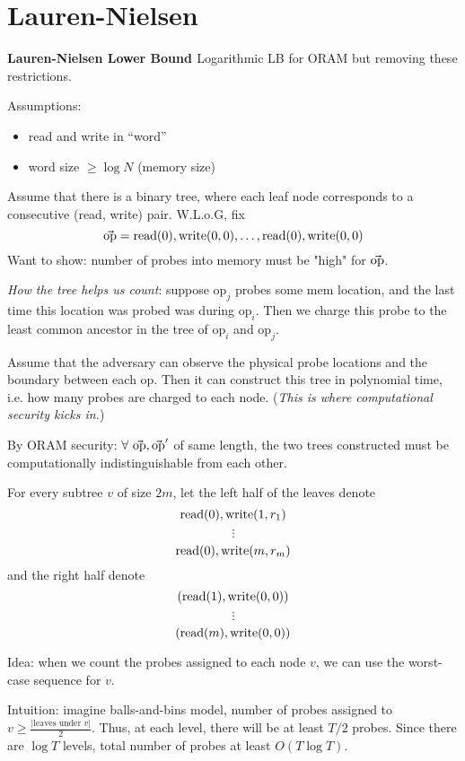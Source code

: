 \section{Lauren-Nielsen}

\textbf{Lauren-Nielsen Lower Bound \cite{larsen18lowerbound}} Logarithmic LB for ORAM but removing these restrictions.

\noindent Assumptions:
\begin{itemize}
  \item read and write in ``word''
  \item word size $\geq \log N$ (memory size)
\end{itemize}

Assume that there is a binary tree, where each leaf node corresponds to a consecutive (read, write) pair. W.L.o.G, fix 
$$\vec{\mbox{op}} = \mbox{read}(0), \mbox{write}(0, 0), \dots, \mbox{read}(0), \mbox{write}(0, 0)$$
Want to show: number of probes into memory must be "high" for $\vec{\mbox{op}}$.

\noindent \emph{How the tree helps us count}: suppose $\mbox{op}_j$ probes some mem location, and the last time this location was probed was during $\mbox{op}_i$. Then we charge this probe to the least common ancestor in the tree of $\mbox{op}_i$ and $\mbox{op}_j$.


Assume that the adversary can observe the physical probe locations and the boundary between each $\mbox{op}$. Then it can construct this tree in polynomial time, i.e. how many probes are charged to each node. (\emph{This is where computational security kicks in.})

By ORAM security: $\forall\ \vec{\mbox{op}}, \vec{\mbox{op}}'$ of same length, the two trees constructed must be computationally indistinguishable from each other.

For every subtree $v$ of size $2m$, let the left half of the leaves denote
$$\mbox{read}(0), \mbox{write}(1, r_1)$$
$$\vdots$$
$$\mbox{read}(0), \mbox{write}(m, r_m)$$
and the right half denote
$$(\mbox{read}(1), \mbox{write}(0, 0))$$
$$\vdots$$
$$(\mbox{read}(m), \mbox{write}(0, 0))$$

Idea: when we count the probes assigned to each node $v$, we can use the worst-case sequence for $v$.

Intuition: imagine balls-and-bins model, number of probes assigned to $v \geq\frac{|\mbox{leaves under } v|}{2}$. Thus, at each level, there will be at least $T/2$ probes. Since there are $\log T$ levels, total number of probes at least $O(T \log T)$.

